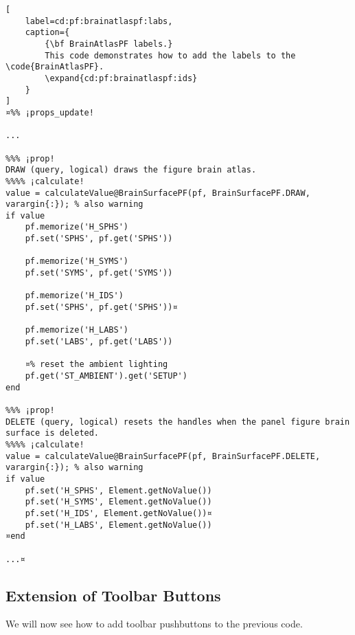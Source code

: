 \documentclass{tufte-handout}
\begin{document}
\begin{lstlisting}[
	label=cd:pf:brainatlaspf:labs,
	caption={
		{\bf BrainAtlasPF labels.}
		This code demonstrates how to add the labels to the \code{BrainAtlasPF}.
		\expand{cd:pf:brainatlaspf:ids}
	}
]
¤%% ¡props_update!

...

%%% ¡prop!
DRAW (query, logical) draws the figure brain atlas.
%%%% ¡calculate!
value = calculateValue@BrainSurfacePF(pf, BrainSurfacePF.DRAW, varargin{:}); % also warning
if value
    pf.memorize('H_SPHS')
    pf.set('SPHS', pf.get('SPHS'))

    pf.memorize('H_SYMS')
    pf.set('SYMS', pf.get('SYMS'))

    pf.memorize('H_IDS')
    pf.set('SPHS', pf.get('SPHS'))¤

    pf.memorize('H_LABS')
    pf.set('LABS', pf.get('LABS'))

    ¤% reset the ambient lighting
    pf.get('ST_AMBIENT').get('SETUP')
end

%%% ¡prop!
DELETE (query, logical) resets the handles when the panel figure brain surface is deleted.
%%%% ¡calculate!
value = calculateValue@BrainSurfacePF(pf, BrainSurfacePF.DELETE, varargin{:}); % also warning
if value
    pf.set('H_SPHS', Element.getNoValue())
    pf.set('H_SYMS', Element.getNoValue())
    pf.set('H_IDS', Element.getNoValue())¤
    pf.set('H_LABS', Element.getNoValue())
¤end

...¤
\end{lstlisting}

\subsection{Extension of Toolbar Buttons}

We will now see how to add toolbar pushbuttons to the previous code.
\end{document}
